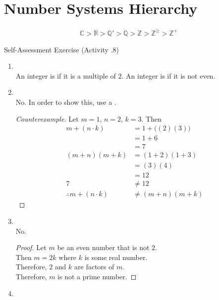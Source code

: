 \documentclass[\main/notes.tex]{subfiles}
\begin{document}
		\section{Number Systems Hierarchy}
			\begin{align*}
				\mathbb{C} > \mathbb{R} > \mathbb{Q}' > \mathbb{Q} > \mathbb{Z} > \mathbb{Z}^{\geq} > \mathbb{Z}^{+}
			\end{align*}
			\pagebreak
			\begin{exercise}{Self-Assessment Exercise (Activity \thechapter.8)}
				\begin{enumerate}
					\item {}\\
						An integer is  if it is a multiple of $2$. An integer is  if it is not even.
					\item {}\\
						No. In order to show this, use a .
						\begin{proof}[Counterexample]
							Let $m = 1$, $n = 2$, $k = 3$. Then
							\begin{align*}
								m + (n \cdot k) &= 1 + \bigl((2)(3)\bigr)\\
								&= 1 + 6\\
								&= 7\\
								(m + n)(m + k) &= (1 + 2)(1 + 3)\\
								&= (3)(4)\\
								&= 12\\
								7 &\neq 12\\
								\therefore m + (n \cdot k) &\neq (m + n)(m + k)
							\end{align*}
						\end{proof}
					\item {}\\
					No.
					\begin{proof}
						Let $m$ be an even number that is not $2$.\\
						Then $m = 2k$ where $k$ is some real number.\\
						Therefore, $2$ and $k$ are factors of $m$.\\
						Therefore, $m$ is not a prime number.
					\end{proof}
					\item {}\\

\end{enumerate}
\end{exercise}
\end{document}
